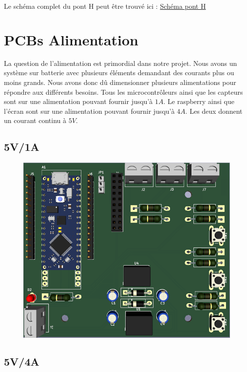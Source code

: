 \documentclass[
	a4paper,									%
	11pt,										%
	twoside,									%
	openright,									%
	notitlepage,									%
	parskip=half,								%
]{scrreprt}										%
\begin{document}
Le schéma complet du pont H peut être trouvé ici : \href{run:./Schema_pont_H}{Schéma pont H}


\section{PCBs Alimentation}

La question de l'alimentation est primordial dans notre projet. Nous avons un système sur batterie avec plusieurs 
éléments demandant des courants plus ou moins grands. Nous avons donc dû dimensionner plusieurs alimentations pour 
répondre aux différents besoins. Tous les microcontrôleurs ainsi que les capteurs sont sur une alimentation pouvant 
fournir jusqu'à $1A$. Le raspberry ainsi que l'écran sont sur une alimentation pouvant fournir jusqu'à $4A$. Les
deux donnent un courant continu à $5V$. \par

\subsection{5V/1A}

\begin{figure}[!h]
	\centering
	\includegraphics[scale=.7]{img/Alimentation5v0.5A.png}
	\label{Alim1A}
\end{figure}






\subsection{5V/4A}
\end{document}

